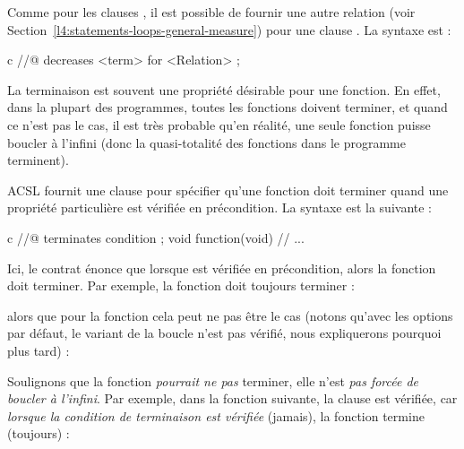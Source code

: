 



\begin{Information}
  Comme pour les clauses , il est possible de fournir
  une autre relation (voir Section~\ref{l4:statements-loops-general-measure})
  pour une clause . La syntaxe est :


  \begin{CodeBlock}{c}
//@ decreases <term> for <Relation> ;
\end{CodeBlock}
\end{Information}


\label{l3:statements-function-calls-terminates}


La terminaison est souvent une propriété désirable pour une fonction.
En effet, dans la plupart des programmes, toutes les fonctions doivent terminer,
et quand ce n'est pas le cas, il est très probable qu'en réalité, une seule
fonction puisse boucler à l'infini (donc la quasi-totalité des fonctions dans le
programme terminent).




ACSL fournit une clause  pour spécifier qu'une fonction
doit terminer quand une propriété particulière est vérifiée en précondition. La
syntaxe est la suivante :


\begin{CodeBlock}{c}
//@ terminates condition ;
void function(void){
  // ...
}
\end{CodeBlock}


Ici, le contrat énonce que lorsque  est vérifiée en
précondition, alors la fonction doit terminer. Par exemple, la fonction
 doit toujours terminer :




alors que pour la fonction  cela peut ne pas être le cas
(notons qu'avec les options par défaut, le variant de la boucle n'est pas
vérifié, nous expliquerons pourquoi plus tard) :




Soulignons que la fonction \textit{pourrait ne pas} terminer, elle n'est
\textit{pas forcée de boucler à l'infini}. Par exemple, dans la fonction suivante,
la clause  est vérifiée, car
\textit{lorsque la condition de terminaison est vérifiée} (jamais), la fonction
termine (toujours) :


